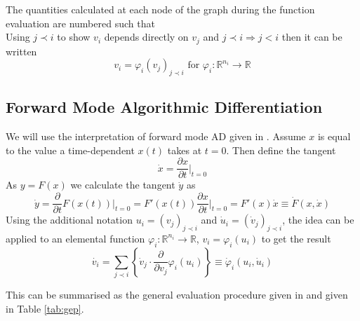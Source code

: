 \documentclass{article}
\begin{document}
The quantities calculated at each node of the graph during the function evaluation are numbered such that
\begin{equation*}
    [ \underbrace{v_{1-n}, \ldots, v_0}_{x} , v_1, \ldots, v_{l-m}, \underbrace{v_{l-m+1}, \ldots, v_l}_{y}]
\end{equation*}
Using $j \prec i$ to show $v_i$ depends directly on $v_j$ and $j \prec i \Longrightarrow j < i$ then it can be written
\begin{equation*}
    v_i = \varphi_i (v_j)_{j \prec i} \text{ for } \varphi_i : \mathbb{R}^{n_i} \longrightarrow \mathbb{R}
\end{equation*}

\subsection{Forward Mode Algorithmic Differentiation}

We will use the interpretation of forward mode AD given in \cite{dhamarticle}. Assume $x$ is equal to the value a time-dependent $x(t)$ takes at $t=0$. Then define the tangent 
\begin{equation*}
    \dot{x} = \frac{\partial x}{\partial t} \Big|_{t=0}
\end{equation*}
As $y = F(x)$ we calculate the tangent $\dot{y}$ as
\begin{equation*}
    \Dot{y} = \frac{\partial}{\partial t} F(x (t)) \Big|_{t=0} 
    = F'(x (t)) \frac{\partial x}{\partial t} \Big|_{t=0}
    = F'(x) \Dot{x}
    \equiv \Dot{F}(x, \Dot{x})
\end{equation*}
Using the additional notation $u_i = (v_j)_{j \prec i}$ and $\Dot{u}_i = (\Dot{v}_j)_{j \prec i}$, the idea can be applied to an elemental function $\varphi_i : \mathbb{R}^{n_i} \longrightarrow \mathbb{R}$, $v_i = \varphi_i (u_i)$ to get the result
\begin{equation}
    \label{tangentequ}
    \Dot{v_i} = \sum_{j \prec i} \left\{ \Dot{v}_j \cdot \frac{\partial}{\partial v_j} \varphi_i (u_i) \right\} 
    \equiv \Dot{\varphi}_i(u_i, \Dot{u}_i)
\end{equation}

This can be summarised as the general evaluation procedure given in \cite{evald} and given in Table \ref{tab:gep}.
\end{document}
